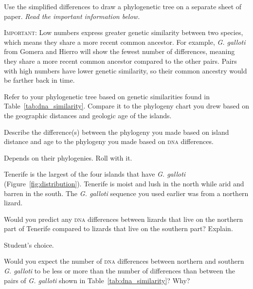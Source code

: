\documentclass[12pt, hidelinks]{exam}
\newcommand*\AnswerBox[2]{%
    \parbox[t][#1]{0.92\textwidth}{%
    \begin{solution}#2\end{solution}}
    \vspace{\stretch{1}}
}
\begin{document}
\begin{questions}
\question \label{genetic_phylogeny}
Use the simplified differences to draw a phylogenetic tree on a separate sheet of paper. \emph{Read the important information below.}

\textsc{Important:} Low numbers express greater genetic similarity between two species, which means they share a more recent common ancestor. For example, \textit{G. galloti} from Gomera and Hierro will show the fewest number of differences, meaning they share a more recent common ancestor compared to the other pairs. Pairs with high numbers have lower genetic similarity, so their common ancestry would be farther back in time.


Refer to your phylogenetic tree based on genetic similarities found in Table~\ref{tab:dna_similarity}. Compare it to the phylogeny chart you drew based on the geographic distances and geologic age of the islands. 

\question Describe the difference(s) between the phylogeny you made based on island distance and age to the phylogeny you made based on \textsc{dna} differences.

\AnswerBox{2\baselineskip}{Depends on their phylogenies. Roll with it.}

%
%

\question
Tenerife is the largest of the four islands that have \textit{G. galloti} (Figure~\ref{fig:distribution}). Tenerife is moist and lush in the north while arid and barren in the south. The \textit{G. galloti} sequence you used earlier was from a northern lizard. 

Would you predict any \textsc{dna} differences between lizards that live on the northern part of Tenerife compared to lizards that live on the southern part? Explain.

\AnswerBox{2\baselineskip}{Student's choice.}

\question
Would you expect the number of \textsc{dna} differences between northern and southern \textit{G. galloti} to be less or more than the number of differences than between the pairs of \textit{G. galloti} shown in Table~\ref{tab:dna_similarity}? Why?


\end{questions}
\end{document}
